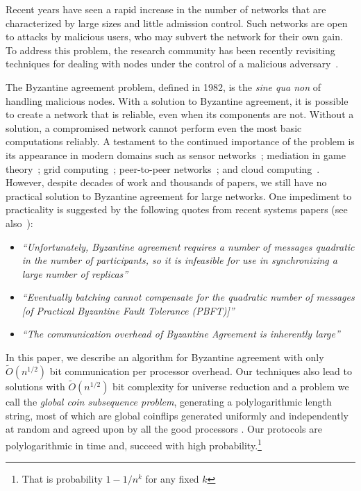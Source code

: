 \documentclass[letterpaper,11pt]{article}
\begin{document}
Recent years have seen a rapid increase in the number of networks that are characterized by large sizes and little admission control.  Such networks are open to attacks by malicious users, who may subvert the network for their own gain.  To address this problem, the research community has been recently revisiting techniques for dealing with nodes under the control of a malicious adversary~\cite{kotla2007zyzzyva,clement-making,1529992,anderson2002worldwide}.

The Byzantine agreement problem, defined in 1982, is the \emph{sine qua non} of handling malicious nodes.   With a solution to Byzantine agreement, it is possible to create a network that is reliable, even when its components are not.  Without a solution, a compromised network cannot perform even the most basic computations reliably.  A testament to the continued importance of the problem is its appearance in modern domains such as sensor networks~\cite{shi2004designing}; mediation in game theory~\cite{ADGH,ADH}; grid computing~\cite{anderson2002worldwide}; peer-to-peer networks~\cite{rhea2003pond}; and cloud computing~\cite{wright2009contemporary}.  However, despite decades of work and thousands of papers, we still have no practical solution to Byzantine agreement for large networks.  One impediment to practicality is suggested by the following quotes from recent systems papers (see also~\cite{castro2002practical,Malkhi97unreliableintrusion,amir2006scaling,agbaria2003overcoming,1098025}):

\begin{itemize}
\item \emph{``Unfortunately, Byzantine agreement requires a number of messages quadratic in the number of participants, so it is infeasible for use in synchronizing a large number of replicas''}~\cite{rhea2003pond}

\item \emph{``Eventually batching cannot compensate for the quadratic number of messages [of Practical Byzantine Fault Tolerance (PBFT)]''}~\cite{CMLRS}

\item \emph{``The communication overhead of Byzantine Agreement is inherently large''}~\cite{Cheng2009219}

\end{itemize}

In this paper, we describe an algorithm for Byzantine agreement with only $\tilde{O}(n^{1/2})$ bit communication per processor overhead.  
Our  techniques also lead to solutions with $\tilde{O}(n^{1/2})$ bit complexity for universe reduction and a problem we call  the {\it  global coin subsequence problem},  generating a polylogarithmic length string, most of which are global coinflips generated uniformly and independently at random and agreed upon by all the good processors .  Our protocols are polylogarithmic in time and, succeed with high probability.\footnote{That is probability $1-1/n^{k}$ for any fixed $k$}
\end{document}
